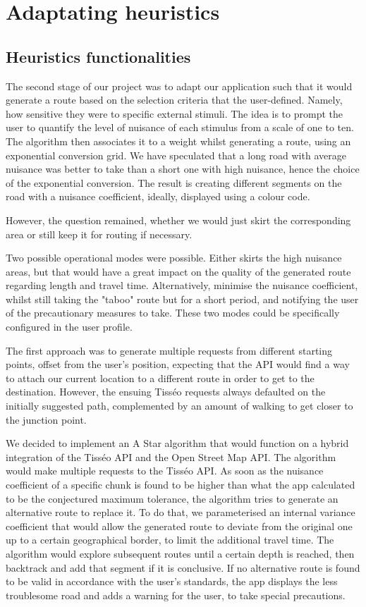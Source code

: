 \section{Adaptating heuristics}


\subsection{Heuristics functionalities}


The second stage of our project was to adapt our application such that it would generate a route based on the selection criteria that the user-defined. Namely, how sensitive they were to specific external stimuli. The idea is to prompt the user to quantify the level of nuisance of each stimulus from a scale of one to ten. The algorithm then associates it to a weight whilst generating a route, using an exponential conversion grid. We have speculated that a long road with average nuisance was better to take than a short one with high nuisance, hence the choice of the exponential conversion. The result is creating different segments on the road with a nuisance coefficient, ideally, displayed using a colour code.


However, the question remained, whether we would just skirt the corresponding area or still keep it for routing if necessary.


Two possible operational modes were possible. Either skirts the high nuisance areas, but that would have a great impact on the quality of the generated route regarding length and travel time. Alternatively, minimise the nuisance coefficient, whilst still taking the "taboo" route but for a short period, and notifying the user of the precautionary measures to take. These two modes could be specifically configured in the user profile.


The first approach was to generate multiple requests from different starting points, offset from the user's position, expecting that the API would find a way to attach our current location to a different route in order to get to the destination. However, the ensuing Tisséo requests always defaulted on the initially suggested path, complemented by an amount of walking to get closer to the junction point.


We decided to implement an A Star algorithm that would function on a hybrid integration of the Tisséo API and the Open Street Map API. The algorithm would make multiple requests to the Tisséo API. As soon as the nuisance coefficient of a specific chunk is found to be higher than what the app calculated to be the conjectured maximum tolerance, the algorithm tries to generate an alternative route to replace it. To do that, we parameterised an internal variance coefficient that would allow the generated route to deviate from the original one up to a certain geographical border, to limit the additional travel time. The algorithm would explore subsequent routes until a certain depth is reached, then backtrack and add that segment if it is conclusive. If no alternative route is found to be valid in accordance with the user's standards, the app displays the less troublesome road and adds a warning for the user, to take special precautions.


